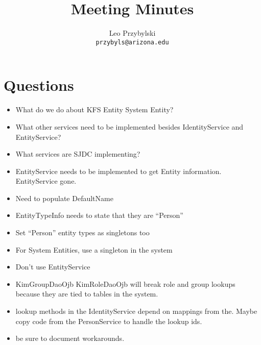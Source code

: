 \documentclass[12pt,notitlepage]{article}
\author{Leo Przybylski \\
\texttt{przybyls@arizona.edu}}
\title{Meeting Minutes}
\begin{document}
\section{Questions}
\begin{itemize}
  \item What do we do about KFS Entity System Entity?
  \item What other services need to be implemented besides IdentityService and EntityService?
  \item What services are SJDC implementing?
\end{itemize}

\begin{itemize}
  \item EntityService needs to be implemented to get Entity information. EntityService gone.
  \item Need to populate DefaultName
  \item EntityTypeInfo needs to state that they are ``Person''
  \item Set ``Person'' entity types as singletons too
  \item For System Entities, use a singleton in the system
  \item Don't use EntityService
  \item KimGroupDaoOjb KimRoleDaoOjb will break role and group lookups because they are tied to tables in the
    system.
  \item lookup methods in the IdentityService depend on mappings from the. Maybe copy code from the PersonService to
    handle the lookup ids.
  \item be sure to document workarounds.
\end{itemize}
\end{document}
